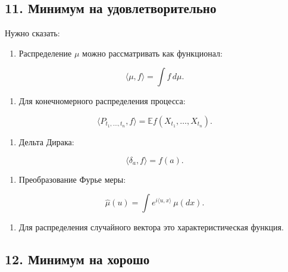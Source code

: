 \documentclass[
  11pt,
  a4paper,
]{article}
\providecommand{\tightlist}{%
  \setlength{\itemsep}{0pt}\setlength{\parskip}{0pt}}
\begin{document}
\subsection{11. Минимум на
удовлетворительно}\label{ux43cux438ux43dux438ux43cux443ux43c-ux43dux430-ux443ux434ux43eux432ux43bux435ux442ux432ux43eux440ux438ux442ux435ux43bux44cux43dux43e}

Нужно сказать:

\begin{enumerate}
\def\labelenumi{\arabic{enumi}.}
\tightlist
\item
  Распределение \(\mu\) можно рассматривать как функционал:
\end{enumerate}

\[
\langle\mu,f\rangle=\int f\,d\mu.
\]

\begin{enumerate}
\def\labelenumi{\arabic{enumi}.}
\setcounter{enumi}{1}
\tightlist
\item
  Для конечномерного распределения процесса:
\end{enumerate}

\[
\langle P_{t_1,\ldots,t_n},f\rangle
=
\mathbb E f(X_{t_1},\ldots,X_{t_n}).
\]

\begin{enumerate}
\def\labelenumi{\arabic{enumi}.}
\setcounter{enumi}{2}
\tightlist
\item
  Дельта Дирака:
\end{enumerate}

\[
\langle\delta_a,f\rangle=f(a).
\]

\begin{enumerate}
\def\labelenumi{\arabic{enumi}.}
\setcounter{enumi}{3}
\tightlist
\item
  Преобразование Фурье меры:
\end{enumerate}

\[
\widehat\mu(u)=\int e^{i\langle u,x\rangle}\,\mu(dx).
\]

\begin{enumerate}
\def\labelenumi{\arabic{enumi}.}
\setcounter{enumi}{4}
\tightlist
\item
  Для распределения случайного вектора это характеристическая функция.
\end{enumerate}

\subsection{12. Минимум на
хорошо}\label{ux43cux438ux43dux438ux43cux443ux43c-ux43dux430-ux445ux43eux440ux43eux448ux43e}
\end{document}
